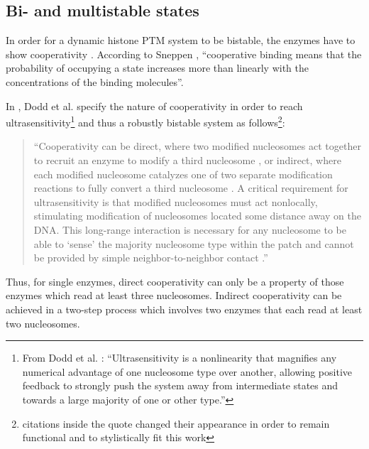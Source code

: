         \subsection{Bi- and multistable states}
            \label{subsec:multistable}
            In order for a dynamic histone PTM system to be bistable, the enzymes have to show cooperativity \cite{dodd2011barriers,sneppen2019theoretical,mayer2020langevin}. According to Sneppen \cite[][p.48]{sneppen2014models}, \enquote{cooperative binding means that the probability of occupying a state increases more than linearly with the concentrations of the binding molecules}.

            In \cite{dodd2011barriers}, Dodd et al. specify the nature of cooperativity in order to reach ultrasensitivity\footnote{From Dodd et al. \cite{dodd2011barriers}: \enquote{Ultrasensitivity is a nonlinearity that magnifies any numerical advantage of one nucleosome type over another, allowing positive feedback to strongly push the system away from intermediate states and towards a large majority of one or other type.}} and thus a robustly bistable system as follows\footnote{citations inside the quote changed their appearance in order to remain functional and to stylistically fit this work}:

            \begin{quote}
                “Cooperativity can be direct, where two modified nucleosomes act together to recruit an enzyme to modify a third nucleosome \cite{3dodd2007theoretical,11sedighi2007epigenetic,15micheelsen2010theory}, or indirect, where each modified nucleosome catalyzes one of two separate modification reactions to fully convert a third nucleosome \cite{3dodd2007theoretical,13david2009inheritance}. A critical requirement for ultrasensitivity is that modified nucleosomes must act nonlocally, stimulating modification of nucleosomes located some distance away on the DNA. This long-range interaction is necessary for any nucleosome to be able to ‘sense’ the majority nucleosome type within the patch and cannot be provided by simple neighbor-to-neighbor contact \cite{3dodd2007theoretical,15micheelsen2010theory}.”
            \end{quote}

            Thus, for single enzymes, direct cooperativity can only be a property of those enzymes which read at least three nucleosomes. Indirect cooperativity can be achieved in a two-step process which involves two enzymes that each read at least two nucleosomes.

